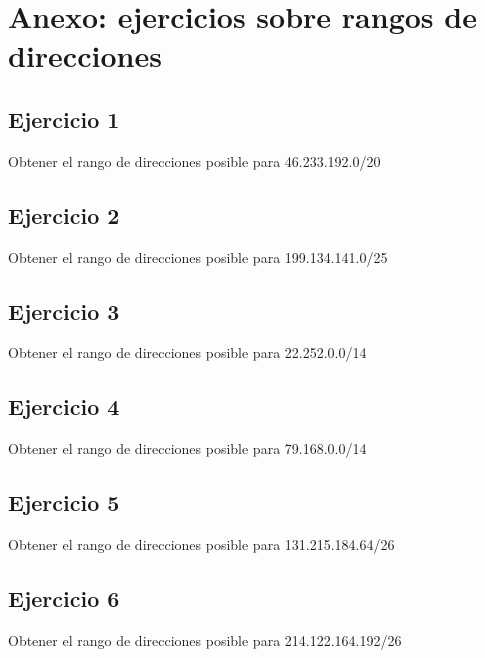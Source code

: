 \documentclass[letterpaper,10pt,spanish]{sphinxmanual}
\begin{document}
\chapter{Anexo: ejercicios sobre rangos de direcciones}
\label{\detokenize{t2_integracion_elementos/ejercicios_subredes_ipv4/rangos_direcciones:anexo-ejercicios-sobre-rangos-de-direcciones}}\label{\detokenize{t2_integracion_elementos/ejercicios_subredes_ipv4/rangos_direcciones::doc}}

\section{Ejercicio 1}
\label{\detokenize{t2_integracion_elementos/ejercicios_subredes_ipv4/rangos_direcciones:ejercicio-1}}
\sphinxAtStartPar
Obtener el rango de direcciones posible para 46.233.192.0/20


\section{Ejercicio 2}
\label{\detokenize{t2_integracion_elementos/ejercicios_subredes_ipv4/rangos_direcciones:ejercicio-2}}
\sphinxAtStartPar
Obtener el rango de direcciones posible para 199.134.141.0/25


\section{Ejercicio 3}
\label{\detokenize{t2_integracion_elementos/ejercicios_subredes_ipv4/rangos_direcciones:ejercicio-3}}
\sphinxAtStartPar
Obtener el rango de direcciones posible para 22.252.0.0/14


\section{Ejercicio 4}
\label{\detokenize{t2_integracion_elementos/ejercicios_subredes_ipv4/rangos_direcciones:ejercicio-4}}
\sphinxAtStartPar
Obtener el rango de direcciones posible para 79.168.0.0/14


\section{Ejercicio 5}
\label{\detokenize{t2_integracion_elementos/ejercicios_subredes_ipv4/rangos_direcciones:ejercicio-5}}
\sphinxAtStartPar
Obtener el rango de direcciones posible para 131.215.184.64/26


\section{Ejercicio 6}
\label{\detokenize{t2_integracion_elementos/ejercicios_subredes_ipv4/rangos_direcciones:ejercicio-6}}
\sphinxAtStartPar
Obtener el rango de direcciones posible para 214.122.164.192/26
\end{document}
